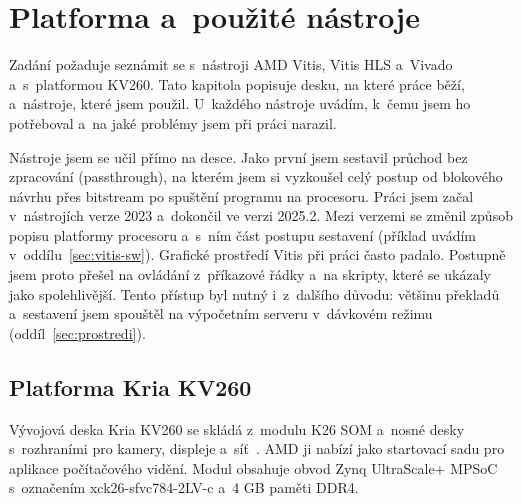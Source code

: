 


\chapter{Platforma a~použité nástroje}
\label{kap:nastroje}

Zadání požaduje seznámit se s~nástroji AMD Vitis, Vitis HLS a~Vivado a~s~platformou KV260. Tato kapitola popisuje desku, na které práce běží, a~nástroje, které jsem použil. U~každého nástroje uvádím, k~čemu jsem ho potřeboval a~na jaké problémy jsem při práci narazil.

Nástroje jsem se učil přímo na desce. Jako první jsem sestavil průchod bez zpracování (passthrough), na kterém jsem si vyzkoušel celý postup od blokového návrhu přes bitstream po spuštění programu na procesoru. Práci jsem začal v~nástrojích verze 2023 a~dokončil ve verzi 2025.2. Mezi verzemi se změnil způsob popisu platformy procesoru a~s~ním část postupu sestavení (příklad uvádím v~oddílu~\ref{sec:vitis-sw}). Grafické prostředí Vitis při práci často padalo. Postupně jsem proto přešel na ovládání z~příkazové řádky a~na skripty, které se ukázaly jako spolehlivější. Tento přístup byl nutný i~z~dalšího důvodu: většinu překladů a~sestavení jsem spouštěl na výpočetním serveru v~dávkovém režimu (oddíl~\ref{sec:prostredi}).


\section{Platforma Kria KV260}
\label{sec:kv260}

Vývojová deska Kria KV260 se skládá z~modulu K26 \ac{SOM} a~nosné desky s~rozhraními pro kamery, displeje a~síť~\cite{amd_kv260}. AMD ji nabízí jako startovací sadu pro aplikace počítačového vidění. Modul obsahuje obvod Zynq UltraScale+ \ac{MPSoC} s~označením xck26-sfvc784-2LV-c a~4 GB paměti DDR4.

